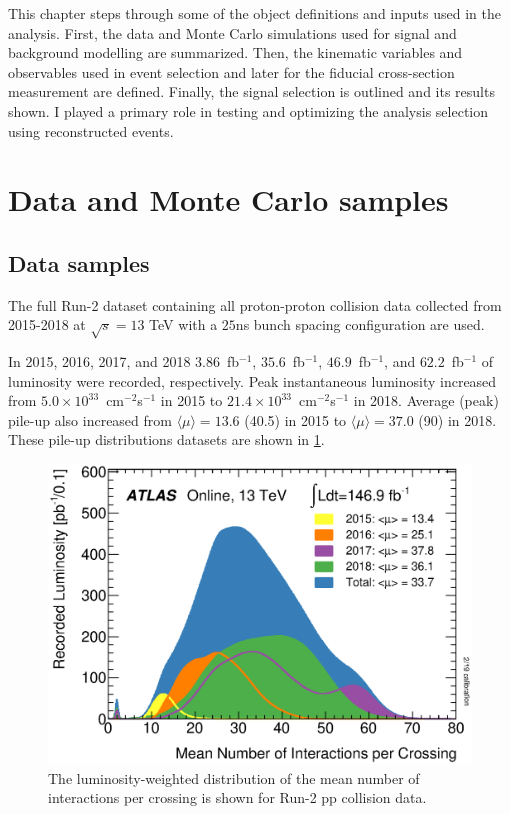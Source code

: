 This chapter steps through some of the object definitions and inputs used in the analysis. First, the data and Monte Carlo simulations used for signal and background modelling are summarized. Then, the kinematic variables and observables used in event selection and later for the fiducial cross-section measurement are defined. Finally, the signal selection is outlined and its results shown. I played a primary role in testing and optimizing the analysis selection using reconstructed events.  

\section{Data and Monte Carlo samples}
\subsection{Data samples}

The full Run-2 dataset containing all proton-proton collision data collected from 2015-2018 at $\sqrt{s}=13$ TeV with a $25$ns bunch spacing configuration are used.

In 2015, 2016, 2017, and 2018 $3.86$~fb$^{-1}$, $35.6$~fb$^{-1}$, $46.9$~fb$^{-1}$, and  $62.2$~fb$^{-1}$ of luminosity were recorded, respectively. Peak instantaneous luminosity increased from $5.0\times 10^{33}$~cm$^{-2}$s$^{-1}$ in 2015 to $21.4\times 10^{33}$~cm$^{-2}$s$^{-1}$ in 2018. Average (peak) pile-up also increased from $\langle\mu\rangle=13.6$ (40.5) in 2015 to  $\langle\mu\rangle=37.0$ (90) in 2018. These pile-up distributions datasets are shown in \ref{fig:mu_profile}. 

\begin{figure}[!htbp]
    \centering 
    \includegraphics[width=0.55\linewidth]{Pictures/mu_2015_2018.eps}
    \caption{The luminosity-weighted distribution of the mean number of interactions per crossing is shown for Run-2 pp collision data. }
    \label{fig:mu_profile}
\end{figure}

